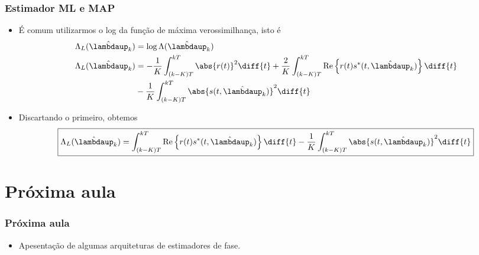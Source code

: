 \begin{frame}[t]
    \frametitle{Estimador ML e MAP}
    \begin{itemize}
        \item É comum utilizarmos o log da função de máxima verossimilhança, isto é
        \begin{align}
            \Lambda_L(\hat{\boldsymbol{\lambdaup}}_{k}) & = \log{\Lambda(\hat{\boldsymbol{\lambdaup}}_{k})} \\
            \Lambda_L(\hat{\boldsymbol{\lambdaup}}_{k}) & = - \frac{1}{K} \int_{(k-K)T}^{kT} \abs{r(t)}^{2} \diff{t} + \frac{2}{K} \int_{(k-K)T}^{kT} \textnormal{Re}\left\{r(t)s^*(t, \hat{\boldsymbol{\lambdaup}}_{k})\right\} \diff{t} \nonumber \\
            & - \frac{1}{K} \int_{(k-K)T}^{kT} \abs{s(t, \hat{\boldsymbol{\lambdaup}}_{k})}^{2} \diff{t}
        \end{align}
        \item Discartando o primeiro, obtemos
        \begin{align}
            \boxed{\Lambda_L(\hat{\boldsymbol{\lambdaup}}_{k}) = \int_{(k-K)T}^{kT} \textnormal{Re}\left\{r(t)s^*(t, \hat{\boldsymbol{\lambdaup}}_{k})\right\} \diff{t} - \frac{1}{K} \int_{(k-K)T}^{kT} \abs{s(t, \hat{\boldsymbol{\lambdaup}}_{k})}^{2} \diff{t}}
        \end{align}
    \end{itemize}
\end{frame}

\section{Próxima aula}
\begin{frame}[t]
    \frametitle{Próxima aula}

    \begin{itemize}
        \item Apesentação de algumas arquiteturas de estimadores de fase.
    \end{itemize}
\end{frame}